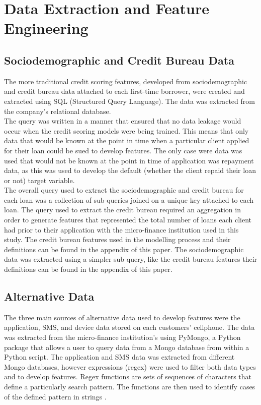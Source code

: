 \section{Data Extraction and Feature Engineering}

\subsection{Sociodemographic and Credit Bureau Data}

The more traditional credit scoring features, developed from sociodemographic and credit bureau data attached to each first-time borrower, were created and extracted using SQL (Structured Query Language). The data was extracted from the company's relational database. \\

The query was written in a manner that ensured that no data leakage would occur when the credit scoring models were being trained. This means that only data that would be known at the point in time when a particular client applied for their loan could be sued to develop features. The only case were data was used that would not be known at the point in time of application was repayment data, as this was used to develop the default (whether the client repaid their loan or not) target variable. \\

The overall query used to extract the sociodemographic and credit bureau for each loan was a collection of sub-queries joined on a unique key attached to each loan. The query used to extract the credit bureau required an aggregation in order to generate features that represented the total number of loans each client had prior to their application with the micro-finance institution used in this study. The credit bureau features used in the modelling process and their definitions can be found in the appendix of this paper. The sociodemographic data was extracted using a simpler sub-query,  like the credit bureau features their definitions can be found in the appendix of this paper.  \\


\subsection{Alternative Data}

The three main sources of alternative data used to develop features were the application, SMS, and device data stored on each customers' cellphone. The data was extracted from the micro-finance institution's using PyMongo, a Python package that allows a user to query data from a Mongo database from within a Python script. The application and SMS data was extracted from different Mongo databases, however expressions (regex) were used to filter both data types and to develop features. Regex functions are sets of sequences of characters that define a particularly search pattern. The functions are then used to identify cases of the defined pattern in strings \parencite{Regex}. \\

